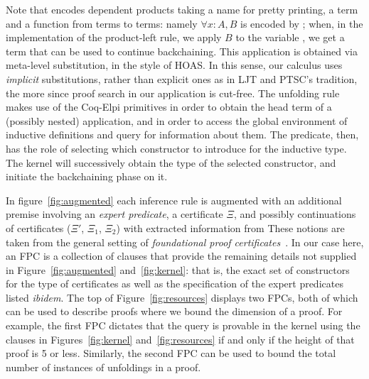 Note that  encodes dependent products taking a name for pretty
printing, a term and a \lP function from terms to terms: namely $\forall x :
A, B$ is encoded by ; when, in the
implementation of the product-left rule, we apply $B$ to the variable
, we get a term that can be used to continue backchaining. This
application is obtained via meta-level substitution, in the style of HOAS. In
this sense, our calculus uses \emph{implicit} substitutions, rather than
explicit ones as in LJT and PTSC's tradition, the more since proof search in
our application is cut-free.
The unfolding rule makes use of the Coq-Elpi primitives
 in order to obtain the head term of a (possibly
nested) application, and  in order to access the global
environment of inductive definitions and query for information about them.
The  predicate, then, has the role of selecting which
constructor to introduce for the inductive type. The kernel will successively
obtain the type of the selected constructor, and initiate the backchaining
phase on it.

In figure~\ref{fig:augmented}  each
inference rule is augmented with an additional premise involving an
\emph{expert predicate}, a certificate $\Xi$, and possibly continuations of
certificates ($\Xi'$, $\Xi_1$, $\Xi_2$) with extracted information from
These notions are taken from the general setting of \emph{foundational
  proof certificates}~\cite{chihani17jar}.
%
In our case here, an FPC is a collection of \lP clauses that
provide the remaining details not supplied in Figure~\ref{fig:augmented} and~\ref{fig:kernel}:
that is, the exact set of constructors for the  type of certificates as
well as the specification of the expert predicates listed \emph{ibidem}.
%
The top of Figure~\ref{fig:resources} displays two FPCs,
both of which can be used to describe proofs where we bound
the dimension of  a proof.
%
For example, the first FPC dictates that the query \mbox{} is
provable in  the kernel using the clauses in Figures~\ref{fig:kernel}
and~\ref{fig:resources} if and only if the height of that proof is 5
or less.
%
Similarly, the second FPC can be used to bound the total number of instances of
unfoldings in a proof.
%

